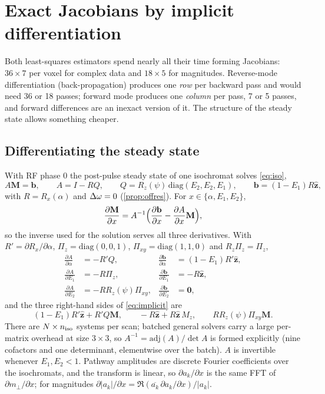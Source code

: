 \section{Exact Jacobians by implicit differentiation}\label{sec:jacobian}

Both least-squares estimators spend nearly all their time forming Jacobians: $36\times7$ per
voxel for complex data and $18\times5$ for magnitudes. Reverse-mode differentiation
(back-propagation) produces one \emph{row} per backward pass and would need 36 or 18 passes;
forward mode produces one \emph{column} per pass, 7 or 5 passes, and forward differences are
an inexact version of it. The structure of the steady state allows something cheaper.

\subsection{Differentiating the steady state}

With RF phase $0$ the post-pulse steady state of one isochromat solves \eqref{eq:iso},
\begin{equation}
  A\mathbf M=\mathbf b,\qquad A=I-RQ,\qquad Q=R_z(\psi)\,\mathrm{diag}(E_2,E_2,E_1),\qquad
  \mathbf b=(1-E_1)R\hat{\mathbf z},
\end{equation}
with $R=R_x(\alpha)$ and $\Delta\omega=0$ (\cref{prop:offres}). For $x\in\{\alpha,E_1,E_2\}$,
\begin{equation}
  \frac{\partial\mathbf M}{\partial x}=A^{-1}\Bigl(\frac{\partial\mathbf b}{\partial x}-\frac{\partial A}{\partial x}\mathbf M\Bigr),
  \label{eq:implicit}
\end{equation}
so the inverse used for the solution serves all three derivatives. With $R'=\partial R_x/\partial\alpha$,
$\Pi_z=\mathrm{diag}(0,0,1)$, $\Pi_{xy}=\mathrm{diag}(1,1,0)$ and $R_z\Pi_z=\Pi_z$,
\begin{align}
  \frac{\partial A}{\partial\alpha}&=-R'Q, &\frac{\partial\mathbf b}{\partial\alpha}&=(1-E_1)R'\hat{\mathbf z},\nonumber\\
  \frac{\partial A}{\partial E_1}&=-R\Pi_z, &\frac{\partial\mathbf b}{\partial E_1}&=-R\hat{\mathbf z},\\
  \frac{\partial A}{\partial E_2}&=-RR_z(\psi)\Pi_{xy}, &\frac{\partial\mathbf b}{\partial E_2}&=\mathbf0,\nonumber
\end{align}
and the three right-hand sides of \eqref{eq:implicit} are
\begin{equation}
  (1-E_1)R'\hat{\mathbf z}+R'Q\mathbf M,\qquad -R\hat{\mathbf z}+R\hat{\mathbf z}\,M_z,\qquad RR_z(\psi)\Pi_{xy}\mathbf M .
\end{equation}
There are $N\times n_{\rm iso}$ systems per scan; batched general solvers carry a large per-matrix
overhead at size $3\times3$, so $A^{-1}=\mathrm{adj}(A)/\det A$ is formed explicitly (nine cofactors
and one determinant, elementwise over the batch). $A$ is invertible whenever $E_1,E_2<1$.
Pathway amplitudes are discrete Fourier coefficients over the isochromats, and the transform
is linear, so $\partial a_k/\partial x$ is the same FFT of $\partial m_\perp/\partial x$; for magnitudes
$\partial|a_k|/\partial x=\Re(\overline{a_k}\,\partial a_k/\partial x)/|a_k|$.

